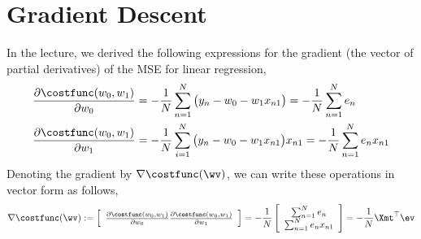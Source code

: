\documentclass{../tex_import/ETHuebung_english}
\begin{document}
\section{Gradient Descent}
In the lecture, we derived the following expressions for the gradient (the vector of partial derivatives) of the MSE for linear regression,
\begin{align}
\frac{\partial \costfunc (w_0, w_1)}{\partial w_0}
    &= -\frac{1}{N} \sum_{n=1}^{N} \big(y_n - w_0 - w_1 x_{n1}\big)
        = - \frac{1}{N} \sum_{n=1}^N e_n \\
\frac{\partial \costfunc (w_0, w_1)}{\partial w_1}
    &= -\frac{1}{N} \sum_{i=1}^{N}  \big(y_n - w_0 - w_1 x_{n1} \big) x_{n1}
        = - \frac{1}{N} \sum_{n=1}^N e_n x_{n1}
\end{align}
Denoting the gradient by $\nabla \costfunc(\wv)$, we can write these
operations in vector form as follows,
\begin{align}
\nabla \costfunc(\wv)
    :=
    \left[
        \begin{array}{c}
            \frac{\partial \costfunc (w_0, w_1)}{\partial w_0}
            \frac{\partial \costfunc (w_0, w_1)}{\partial w_1}
    \end{array}
    \right]
    = -\frac{1}{N}
    \left[
        \begin{array}{c}
            \sum_{n=1}^N e_n \\ \sum_{n=1}^N e_n x_{n1}
        \end{array}
        \right]
    = -\frac{1}{N} \Xmt^\top \ev
\label{eq:gradients}
\end{align}
\end{document}
